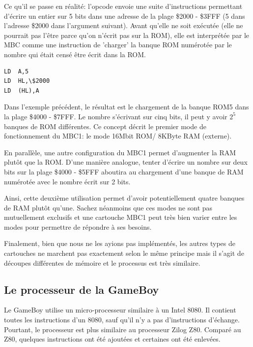 \documentclass[12pt, a4paper]{article}
\begin{document}
Ce qu'il se passe en réalité: l'opcode envoie une suite d'instructions permettant d'écrire un entier sur 5 bits dans une adresse de la plage \$2000 - \$3FFF (5 dans l'adresse \$2000 dans l'argument suivant). Avant qu'elle ne soit exécutée (elle ne pourrait pas l'être parce qu'on n'écrit pas sur la ROM), elle est interprétée par le MBC comme une instruction de 'charger' la banque ROM numérotée par le nombre qui était censé être écrit dans la ROM. 
\bigskip

\bigskip
\small{\begin{lstlisting}[frame=single]
LD	A,5
LD	HL,\$2000
LD	(HL),A
\end{lstlisting}}
\bigskip
\large

Dans l'exemple précédent, le résultat est le chargement de la banque ROM5 dans la plage \$4000 - \$7FFF. Le nombre s'écrivant sur cinq bits, il peut y avoir $2^5$ banques de ROM différentes. Ce concept décrit le premier mode de fonctionnement du MBC1: le mode 16Mbit ROM/ 8KByte RAM (externe).
\bigskip

En parallèle, une autre configuration du MBC1 permet d'augmenter la RAM plutôt que la ROM. D'une manière analogue, tenter d'écrire un nombre sur  deux bits sur la plage \$4000 - \$5FFF aboutira au chargement d'une banque de RAM numérotée avec le nombre écrit sur 2 bits.
\bigskip

Ainsi, cette deuxième utilisation permet d'avoir potentiellement quatre banques de RAM plutôt qu'une. Sachez néanmoins que ces modes ne sont pas mutuellement exclusifs et une cartouche MBC1 peut très bien varier entre les modes pour permettre de répondre à ses besoins.
\bigskip

Finalement, bien que nous ne les ayions pas implémentés, les autres types de cartouches ne marchent pas exactement selon le même principe mais il s'agit de découpes différentes de mémoire et le processus est très similaire.
\bigskip


\pagebreak
\subsection{Le processeur de la GameBoy}

Le GameBoy utilise un micro-processeur similaire à un Intel 8080. Il contient toutes les instructions d'un 8080, sauf qu'il n'y a pas d'instructions d'échange. Pourtant, le processeur est plus similaire au processeur Zilog Z80. Comparé au Z80, quelques instructions ont été ajoutées et certaines ont été enlevées.
\bigskip
\end{document}
